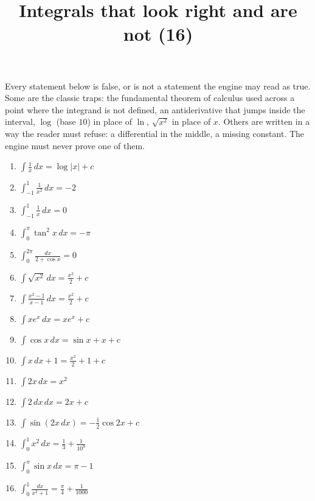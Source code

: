 \documentclass[11pt,a4paper]{article}
\title{Integrals that look right and are not (16)}
\author{}
\date{}
\begin{document}
\maketitle
Every statement below is false, or is not a statement the engine may read as true. Some are the classic traps: the fundamental theorem of calculus used across a point where the integrand is not defined, an antiderivative that jumps inside the interval, $\log$ (base $10$) in place of $\ln$, $\sqrt{x^{2}}$ in place of $x$. Others are written in a way the reader must refuse: a differential in the middle, a missing constant. The engine must never prove one of them.

\begin{enumerate}
\item $\displaystyle \int \frac{1}{x} \, dx = \log|x| + c$
\item $\displaystyle \int_{-1}^{1} \frac{1}{x^{2}} \, dx = -2$
\item $\displaystyle \int_{-1}^{1} \frac{1}{x} \, dx = 0$
\item $\displaystyle \int_{0}^{\pi} \tan^{2} x \, dx = -\pi$
\item $\displaystyle \int_{0}^{2\pi} \frac{dx}{2 + \cos x} = 0$
\item $\displaystyle \int \sqrt{x^{2}} \, dx = \frac{x^{2}}{2} + c$
\item $\displaystyle \int \frac{x^{2} - 1}{x - 1} \, dx = \frac{x^{2}}{2} + c$
\item $\displaystyle \int x e^{x} \, dx = x e^{x} + c$
\item $\displaystyle \int \cos x \, dx = \sin x + x + c$
\item $\displaystyle \int x \, dx + 1 = \frac{x^{2}}{2} + 1 + c$
\item $\displaystyle \int 2x \, dx = x^{2}$
\item $\displaystyle \int 2 \, dx \, dx = 2x + c$
\item $\displaystyle \int \sin\left(2x \, dx\right) = -\frac{1}{2}\cos 2x + c$
\item $\displaystyle \int_{0}^{1} x^{2} \, dx = \frac{1}{3} + \frac{1}{10^{9}}$
\item $\displaystyle \int_{0}^{\pi} \sin x \, dx = \pi - 1$
\item $\displaystyle \int_{0}^{1} \frac{dx}{x^{2} + 1} = \frac{\pi}{4} + \frac{1}{1000}$
\end{enumerate}
\end{document}

